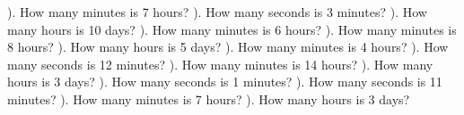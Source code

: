 \documentclass{article}%
\begin{document}
\newline%
). How many minutes is 7 hours?%
\newline%
\newline%
). How many seconds is 3 minutes?%
\newline%
\newline%
). How many hours is 10 days?%
\newline%
\newline%
). How many minutes is 6 hours?%
\newline%
\newline%
). How many minutes is 8 hours?%
\newline%
\newline%
). How many hours is 5 days?%
\newline%
\newline%
). How many minutes is 4 hours?%
\newline%
\newline%
). How many seconds is 12 minutes?%
\newline%
\newline%
). How many minutes is 14 hours?%
\newline%
\newline%
). How many hours is 3 days?%
\newline%
\newline%
). How many seconds is 1 minutes?%
\newline%
\newline%
). How many seconds is 11 minutes?%
\newline%
\newline%
). How many minutes is 7 hours?%
\newline%
\newline%
). How many hours is 3 days?%
\newline%
\newline%
\end{document}
